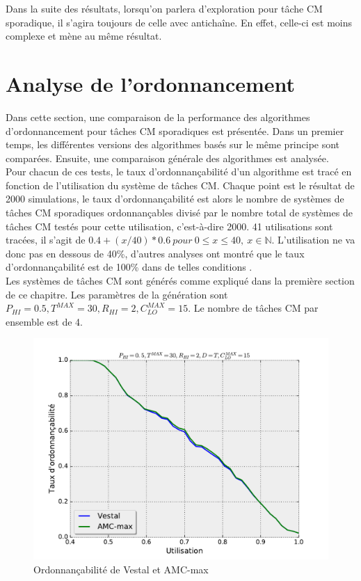 \documentclass[12pt,a4paper,oneside]{book}
\theoremstyle{break}
\theoremstyle{breakplain}
\begin{document}
Dans la suite des résultats, lorsqu'on parlera d'exploration pour tâche CM sporadique, il s'agira toujours de celle avec antichaîne. En effet, celle-ci est moins complexe et mène au même résultat.

\section{Analyse de l'ordonnancement}
Dans cette section, une comparaison de la performance des algorithmes d'ordonnancement pour tâches CM sporadiques est présentée. Dans un premier temps, les différentes versions des algorithmes basés sur le même principe sont comparées. Ensuite, une comparaison générale des algorithmes est analysée.\\

Pour chacun de ces tests, le taux d'ordonnançabilité d'un algorithme est tracé en fonction de l'utilisation du système de tâches CM. Chaque point est le résultat de 2000 simulations, le taux d'ordonnançabilité est alors le nombre de systèmes de tâches CM sporadiques ordonnançables divisé par le nombre total de systèmes de tâches CM testés pour cette utilisation, c'est-à-dire 2000. 41 utilisations sont tracées, il s'agit de $0.4+(x/40)*0.6\ pour\ 0 \le x \le 40,\ x \in \mathbb{N}$. L'utilisation ne va donc pas en dessous de 40\%, d'autres analyses ont montré que le taux d'ordonnançabilité est de 100\% dans de telles conditions \cite{ekberg2012outstanding}.\\

Les systèmes de tâches CM sont générés comme expliqué dans la première section de ce chapitre. Les paramètres de la génération sont $P_{HI} = 0.5, T^{MAX} = 30, R_{HI} = 2, C^{MAX}_{LO} = 15$. Le nombre de tâches CM par ensemble est de 4.\\

\pagebreak

\begin{figure}[h]
\centering
\includegraphics[width=\textwidth]{./results/perfAMCVestal.pdf}
\caption{Ordonnançabilité de Vestal et AMC-max}
\label{res:vestalamc}
\end{figure}
\end{document}
